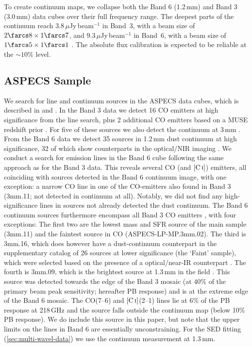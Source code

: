 \documentclass[twocolumn]{aastex62}
\newcommand{\CI}{\ensuremath{\mathrm{[C\, \textsc{i}]}}}
\begin{document}
To create continuum maps, we collapse both the Band 6 (1.2\,mm) and Band 3
(3.0\,mm) data cubes over their full frequency range.  The deepest parts of the
continuum reach $3.8\,\mu$Jy\,beam$^{-1}$ in Band~3, with a beam size of
$2\farcs8 \times 1\farcs7$, and $9.3\,\mu$Jy\,beam$^{-1}$ in Band~6, with a
beam size of $1\farcs5 \times 1\farcs1$ \citep{Gonzalez-Lopez2019,
  Gonzalez-Lopez2020}.  The absolute flux calibration is expected to be
reliable at the $\sim 10\%$ level.

\subsection{ASPECS Sample}
\label{sec:sample}
We search for line and continuum sources in the ASPECS data cubes, which is
described in \cite{Gonzalez-Lopez2019} and \cite{Gonzalez-Lopez2020}.  In the
Band 3 data we detect 16 CO emitters at high significance from the line search,
plus 2 additional CO emitters based on a MUSE redshift prior
\citep{Boogaard2019}.  For five of these sources we also detect the continuum
at 3\,mm \citep{Gonzalez-Lopez2019}.  From the Band 6 data we detect 35 sources
in 1.2\,mm dust continuum at high significance, 32 of which show counterparts
in the optical/NIR imaging \citep{Gonzalez-Lopez2020, Aravena2020}.  We conduct
a search for emission lines in the Band 6 cube following the same approach as
for the Band 3 data.  This reveals several CO (and \CI) emitters, all
coinciding with sources detected in the Band 6 continuum image, with one
exception: a narrow CO line in one of the CO-emitters also found in Band 3
(3mm.11; not detected in continuum at all).  Notably, we did not find any
high-significance lines in sources not already detected the dust continuum.
The Band 6 continuum sources furthermore encompass all Band 3 CO emitters
\citep{Aravena2020}, with four exceptions: The first two are the lowest mass
and SFR source of the main sample (3mm.11) and the faintest source in CO
(ASPECS-LP-MP.3mm.02).  The third is 3mm.16, which does however have a
dust-continuum counterpart in the supplementary catalog of 26 sources at lower
significance (the `Faint' sample), which were selected based on the presence of
a optical/near-IR counterpart \citep{Gonzalez-Lopez2020}.  The fourth is
3mm.09, which is the brightest source at 1.3\,mm in the field
\citep[UDF1;][]{Dunlop2017}.  This source was detected towards the edge of the
Band 3 mosaic (at $40$\% of the primary beam peak sensitivity; hereafter PB
response) and is at the extreme edge of the Band 6 mosaic.  The CO(7--6) and
\CI(2--1) lines lie at $6\%$ of the PB response at 218\,GHz and the source
falls outside the continuum map (below 10\% PB response).  We do include this
source in this paper, but note that the upper limits on the lines in Band 6 are
essentially unconstraining.  For the SED fitting
(\autoref{sec:multi-wavel-data}) we use the continuum measurement at 1.3\,mm.
\end{document}
